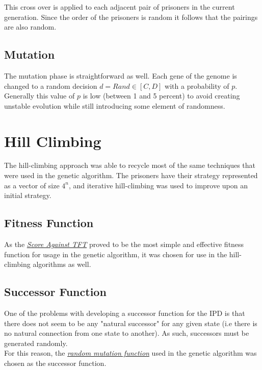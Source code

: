 \documentclass[12pt]{article}
\begin{document}
This cross over is applied to each adjacent pair of prisoners in the current
generation.  Since the order of the prisoners is random it follows that the pairings
are also random.

\subsection{Mutation}
\label{mutation}

The mutation phase is straightforward as well.  Each gene of the genome is changed
to a random decision $d = Rand \in [C, D]$ with a probability of $p$.  Generally
this value of $p$ is low (between 1 and 5 percent) to avoid creating unstable
evolution while still introducing some element of randomness.

\pagebreak

\section{Hill Climbing}

The hill-climbing approach was able to recycle most of the same techniques that
were used in the genetic algorithm. The prisoners have their strategy
represented as a vector of size $4^n$, and iterative hill-climbing was used
to improve upon an initial strategy.

\subsection {Fitness Function}

As the \textit{\hyperref[tft]{Score Against TFT}} proved to be the most simple
and effective fitness function for usage in the genetic algorithm, it was
chosen for use in the hill-climbing algorithms as well.

\subsection {Successor Function}

One of the problems with developing a successor function for the IPD is that
there does not seem to be any "natural successor" for any given state (i.e
there is no natural connection from one state to another). As such, successors
must be generated randomly.\\

For this reason, the \textit{\hyperref[mutation]{random mutation function}}
used in the genetic algorithm was chosen as the successor function.
\end{document}
